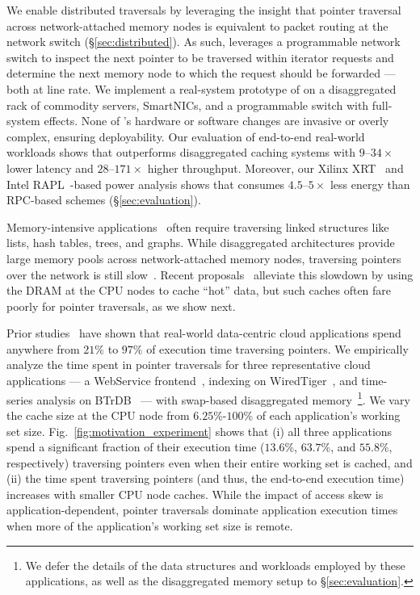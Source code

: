 We enable distributed traversals by leveraging the insight that pointer traversal across network-attached memory nodes is equivalent to packet routing at the network switch (\S\ref{sec:distributed}). As such, \pulse leverages a programmable network switch to inspect the next pointer to be traversed within iterator requests and determine the next memory node to which the request should be forwarded --- both at line rate. We implement a real-system prototype of \pulse on a disaggregated rack of commodity servers, SmartNICs, and a programmable switch with full-system effects. None of \pulse's hardware or software changes are invasive or overly complex, ensuring deployability.  Our evaluation of end-to-end real-world workloads shows that \pulse outperforms disaggregated caching systems with $9$--$34\times$ lower latency and $28$--$171\times$ higher throughput. Moreover, our Xilinx XRT~\cite{xilinx_xrt} and Intel RAPL~\cite{intel_rapl}-based power analysis shows that \pulse consumes $4.5$--$5\times$ less energy than RPC-based schemes (\S\ref{sec:evaluation}).


Memory-intensive applications~\cite{scuba, cachelib, tao, memcache, flighttracker, twittercache, spark} often require traversing linked structures like lists, hash tables, trees, and graphs. 
While disaggregated architectures provide large memory pools across network-attached memory nodes, traversing pointers over the network is still slow~\cite{disagg}. Recent proposals~\cite{disagg, legoos, mind, infiniswap, fastswap} alleviate this slowdown by using the DRAM at the CPU nodes to cache ``hot'' data, but such caches often fare poorly for pointer traversals, as we show next. 

 Prior studies~\cite{graphchi, monetdb, spark, voltdb, memc3, db1000, memcached} have shown that real-world data-centric cloud applications spend anywhere from $21\%$ to $97\%$ of execution time traversing pointers. We empirically analyze the time spent in pointer traversals for three representative cloud applications --- a WebService frontend~\cite{aifm}, indexing on WiredTiger~\cite{wiredtiger}, and time-series analysis on BTrDB~\cite{btrdb} --- with swap-based disaggregated memory~\cite{infiniswap}\footnote{We defer the details of the data structures and workloads employed by these applications, as well as the disaggregated memory setup to \S\ref{sec:evaluation}.}. We vary the cache size at the CPU node from $6.25$\%-$100$\% of each application's working set size. Fig.~\ref{fig:motivation_experiment} shows that (i) all three applications spend a significant fraction of their execution time ($13.6$\%, $63.7$\%, and $55.8$\%, respectively) traversing pointers even when their entire working set is cached, and (ii) the time spent traversing pointers (and thus, the end-to-end execution time) increases with smaller CPU node caches. While the impact of access skew is application-dependent, pointer traversals dominate application execution times when more of the application's working set size is remote. 


